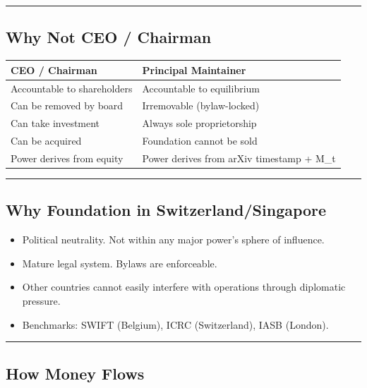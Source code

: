 \documentclass[
  12pt,
]{article}
\providecommand{\tightlist}{%
  \setlength{\itemsep}{0pt}\setlength{\parskip}{0pt}}
\begin{document}
\begin{center}\rule{0.5\linewidth}{0.5pt}\end{center}

\subsection{Why Not CEO / Chairman}\label{why-not-ceo-chairman}

\begin{longtable}[]{@{}ll@{}}
\toprule\noalign{}
CEO / Chairman & Principal Maintainer \\
\midrule\noalign{}
\endhead
\bottomrule\noalign{}
\endlastfoot
Accountable to shareholders & Accountable to equilibrium \\
Can be removed by board & Irremovable (bylaw-locked) \\
Can take investment & Always sole proprietorship \\
Can be acquired & Foundation cannot be sold \\
Power derives from equity & Power derives from arXiv timestamp + M\_t \\
\end{longtable}

\begin{center}\rule{0.5\linewidth}{0.5pt}\end{center}

\subsection{Why Foundation in Switzerland/Singapore}\label{why-foundation-in-switzerland-singapore}

\begin{itemize}
\tightlist
\item
  Political neutrality. Not within any major power's sphere of influence.
\item
  Mature legal system. Bylaws are enforceable.
\item
  Other countries cannot easily interfere with operations through diplomatic pressure.
\item
  Benchmarks: SWIFT (Belgium), ICRC (Switzerland), IASB (London).
\end{itemize}

\begin{center}\rule{0.5\linewidth}{0.5pt}\end{center}

\subsection{How Money Flows}\label{how-money-flows}
\end{document}
